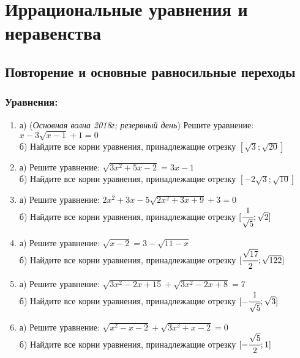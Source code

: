 \documentclass[12pt]{article}
\begin{document}



\newpage
\section{Иррациональные уравнения и неравенства}
\subsection{Повторение и основные равносильные переходы}

\subsubsection*{Уравнения:}
\begin{enumerate}[start=1,label={\itshape\bfseries \arabic*.}]

\item а) (\textit{Основная волна 2018г;  резервный день}) Решите уравнение: $x - 3\sqrt{x - 1} + 1 = 0$ \\
      б) Найдите все корни уравнения, принадлежащие отрезку $[\sqrt{3}; \sqrt{20}]$

\item а) Решите уравнение: $\sqrt{3x^2 + 5x - 2} = 3x - 1$\\
      б) Найдите все корни уравнения, принадлежащие отрезку $[-2\sqrt{3}; \sqrt{10}]$

\item а) Решите уравнение: $2x^2 + 3x - 5\sqrt{2x^2 +3x + 9} + 3 = 0$\\
      б) Найдите все корни уравнения, принадлежащие отрезку $[\cfrac{1}{\sqrt{5}}; \sqrt{2}]$

\item а) Решите уравнение: $\sqrt{x - 2} = 3 - \sqrt{11 - x}$\\
      б) Найдите все корни уравнения, принадлежащие отрезку $[\cfrac{\sqrt{17}}{2}; \sqrt{122}]$

\item а) Решите уравнение: $\sqrt{3x^2 - 2x + 15} + \sqrt{3x^2 - 2x + 8} = 7$\\
      б) Найдите все корни уравнения, принадлежащие отрезку $[-\cfrac{1}{\sqrt{5}}; \sqrt{3}]$

\item а) Решите уравнение: $\sqrt{x^2 - x - 2} + \sqrt{3x^2 + x - 2} = 0$\\
      б) Найдите все корни уравнения, принадлежащие отрезку $[-\cfrac{\sqrt{5}}{2}; 1]$

\end{enumerate}
\end{document}
